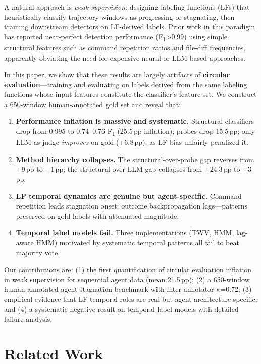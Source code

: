 \documentclass[11pt,a4paper]{article}
\newcommand{\fone}{F\textsubscript{1}}
\newcommand{\pp}{\,pp}
\begin{document}
A natural approach is \emph{weak supervision}: designing labeling functions (LFs) that heuristically classify trajectory windows as progressing or stagnating, then training downstream detectors on LF-derived labels.
Prior work in this paradigm has reported near-perfect detection performance (\fone{}>0.99) using simple structural features such as command repetition ratios and file-diff frequencies, apparently obviating the need for expensive neural or LLM-based approaches.

In this paper, we show that these results are largely artifacts of \textbf{circular evaluation}---training and evaluating on labels derived from the same labeling functions whose input features constitute the classifier's feature set.
We construct a 650-window human-annotated gold set and reveal that:

\begin{enumerate}
\item \textbf{Performance inflation is massive and systematic.} Structural classifiers drop from 0.995 to 0.74--0.76 \fone{} (25.5\pp{} inflation); probes drop 15.5\pp; only LLM-as-judge \emph{improves} on gold (+6.8\pp), as LF bias unfairly penalized it.
\item \textbf{Method hierarchy collapses.} The structural-over-probe gap reverses from +9\pp{} to $-$1\pp; the structural-over-LLM gap collapses from +24.3\pp{} to +3\pp.
\item \textbf{LF temporal dynamics are genuine but agent-specific.} Command repetition leads stagnation onset; outcome backpropagation lags---patterns preserved on gold labels with attenuated magnitude.
\item \textbf{Temporal label models fail.} Three implementations (TWV, HMM, lag-aware HMM) motivated by systematic temporal patterns all fail to beat majority vote.
\end{enumerate}

Our contributions are: (1) the first quantification of circular evaluation inflation in weak supervision for sequential agent data (mean 21.5\pp); (2) a 650-window human-annotated agent stagnation benchmark with inter-annotator $\kappa$=0.72; (3) empirical evidence that LF temporal roles are real but agent-architecture-specific; and (4) a systematic negative result on temporal label models with detailed failure analysis.

\section{Related Work}
\label{sec:related}
\end{document}

